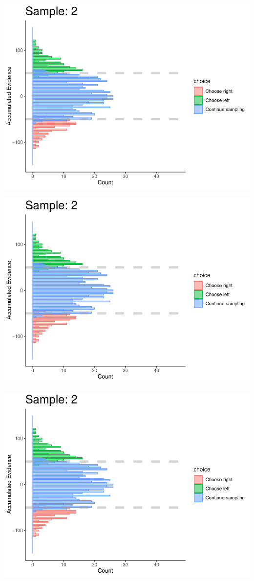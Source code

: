 \documentclass[
]{book}
\begin{document}
\begin{center}\includegraphics[width=0.8\linewidth]{LateNightBayes_files/figure-latex/fixed_check-13} \end{center}

\begin{center}\includegraphics[width=0.8\linewidth]{LateNightBayes_files/figure-latex/fixed_check-14} \end{center}

\begin{center}\includegraphics[width=0.8\linewidth]{LateNightBayes_files/figure-latex/fixed_check-15} \end{center}
\end{document}
